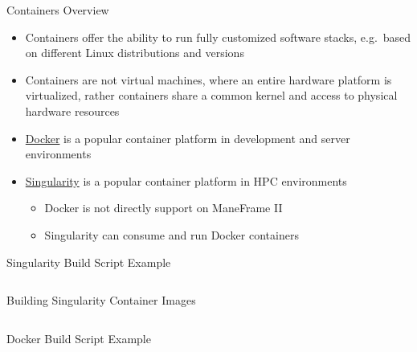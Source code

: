 \documentclass[aspectratio=169]{beamer}
\begin{document}
\begin{frame}{Containers Overview}
\begin{itemize}
\item Containers offer the ability to run fully customized software stacks,
e.g.\ based on different Linux distributions and versions
\item Containers are not virtual machines, where an entire hardware platform is
virtualized, rather containers share a common kernel and access to physical
hardware resources
\item \href{https://www.docker.com}{Docker} is a popular container platform in
development and server environments
\item \href{https://sylabs.io}{Singularity} is a popular container platform in
HPC environments
\begin{itemize}
\item Docker is not directly support on ManeFrame II
\item Singularity can consume and run Docker containers
\end{itemize}
\end{itemize}
\end{frame}

\begin{frame}{Singularity Build Script Example}
\begin{listing}[H]
\inputminted{Singularity}{examples/python3.singularity}
\caption{Example Singularity build file that uses Ubuntu 18.04 and Python3 with
package installation via \texttt{apt} and \texttt{pip}.}
\end{listing}
\end{frame}

\begin{frame}{Building Singularity Container Images}
\begin{listing}[H]
\inputminted{sh}{examples/build_python3_singularity.sh}
\caption{Steps to build a Singularity container image. Note that building
Singularity container images from build scripts on M2 requires permission.
Request permission via \href{mailto:help@smu.edu}{help@smu.edu}.}
\end{listing}
\end{frame}

\begin{frame}{Docker Build Script Example}
\begin{listing}[H]
\inputminted{Dockerfile}{examples/python3.dockerfile}
\caption{Example Dockerfile that uses Ubuntu 18.04 and Python3 with package
installation via \texttt{apt} and \texttt{pip}.}
\end{listing}
\end{frame}
\end{document}
